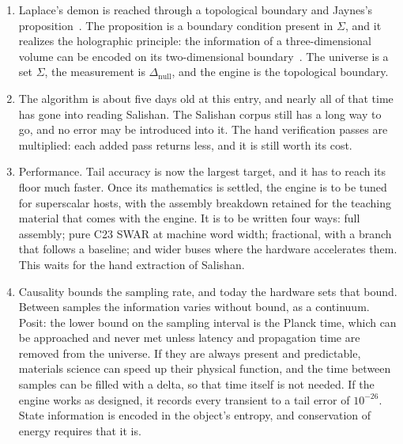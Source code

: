 \begin{enumerate}
\begin{enumerate}
\item Self-detection reduces to $\mathrm{appxrep}(\Delta) \circ \pi_0$. The machine therefore uses the same
code paths, registers and set operations for observing itself as for its primary computation.
\end{enumerate}

\item Laplace's demon is reached through a topological boundary and Jaynes's
proposition~\cite{src:Jaynes}. The proposition is a boundary condition present in $\Sigma$, and it
realizes the holographic principle: the information of a three-dimensional volume can be encoded on
its two-dimensional boundary~\cite{src:Susskind-1995}. The universe is a set $\Sigma$, the
measurement is $\Delta_{\mathrm{null}}$, and the engine is the topological boundary.

\item The algorithm is about five days old at this entry, and nearly all of that time has gone into
reading Salishan. The Salishan corpus still has a long way to go, and no error may be introduced into
it. The hand verification passes are multiplied: each added pass returns less, and it is still worth
its cost.

\item Performance. Tail accuracy is now the largest target, and it has to reach its floor much faster.
Once its mathematics is settled, the engine is to be tuned for superscalar hosts, with the assembly
breakdown retained for the teaching material that comes with the engine. It is to be written four ways:
full assembly; pure C23 SWAR at machine word width; fractional, with a branch that follows a baseline;
and wider buses where the hardware accelerates them. This waits for the hand extraction of Salishan.

\item Causality bounds the sampling rate, and today the hardware sets that bound. Between samples the
information varies without bound, as a continuum. Posit: the lower bound on the sampling interval is
the Planck time, which can be approached and never met unless latency and propagation time are
removed from the universe. If they are always present and predictable, materials science can speed up
their physical function, and the time between samples can be filled with a delta, so that time itself
is not needed. If the engine works as designed, it records every transient to a tail error of
$10^{-26}$. State information is encoded in the object's entropy, and conservation of energy requires
that it is.


\end{enumerate}
